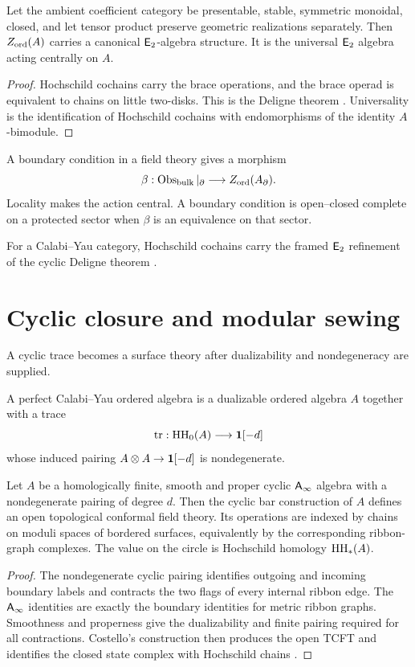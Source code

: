 \begin{theorem}
Let the ambient coefficient category be presentable, stable, symmetric monoidal, closed, and let tensor product preserve geometric realizations separately. Then $Z_{\mathrm{ord}}(A)$ carries a canonical $\mathsf E_2$-algebra structure. It is the universal $\mathsf E_2$ algebra acting centrally on $A$.
\end{theorem}
\begin{proof}
Hochschild cochains carry the brace operations, and the brace operad is equivalent to chains on little two-disks. This is the Deligne theorem \cite{McClureSmith,KontsevichSoibelmanDeligne}. Universality is the identification of Hochschild cochains with endomorphisms of the identity $A$-bimodule.
\end{proof}

A boundary condition in a field theory gives a morphism
\[
 \beta:\operatorname{Obs}_{\mathrm{bulk}}|_{\partial}\longrightarrow Z_{\mathrm{ord}}(A_{\partial}).
\]
Locality makes the action central. A boundary condition is open--closed complete on a protected sector when $\beta$ is an equivalence on that sector.

For a Calabi--Yau category, Hochschild cochains carry the framed $\mathsf E_2$ refinement of the cyclic Deligne theorem \cite{BravRozenblyum}.

\chapter{Cyclic closure and modular sewing}
A cyclic trace becomes a surface theory after dualizability and nondegeneracy are supplied.

\begin{definition}
A perfect Calabi--Yau ordered algebra is a dualizable ordered algebra $A$ together with a trace
\[
 \operatorname{tr}:\operatorname{HH}_0(A)\longrightarrow\mathbf{1}[-d]
\]
whose induced pairing $A\otimes A\to\mathbf{1}[-d]$ is nondegenerate.
\end{definition}

\begin{theorem}
Let $A$ be a homologically finite, smooth and proper cyclic $\mathsf A_\infty$ algebra with a nondegenerate pairing of degree $d$.  Then the cyclic bar construction of $A$ defines an open topological conformal field theory.  Its operations are indexed by chains on moduli spaces of bordered surfaces, equivalently by the corresponding ribbon-graph complexes.  The value on the circle is Hochschild homology $\operatorname{HH}_*(A)$.
\end{theorem}
\begin{proof}
The nondegenerate cyclic pairing identifies outgoing and incoming boundary labels and contracts the two flags of every internal ribbon edge.  The $\mathsf A_\infty$ identities are exactly the boundary identities for metric ribbon graphs.  Smoothness and properness give the dualizability and finite pairing required for all contractions.  Costello's construction then produces the open TCFT and identifies the closed state complex with Hochschild chains \cite{CostelloCY}.
\end{proof}

